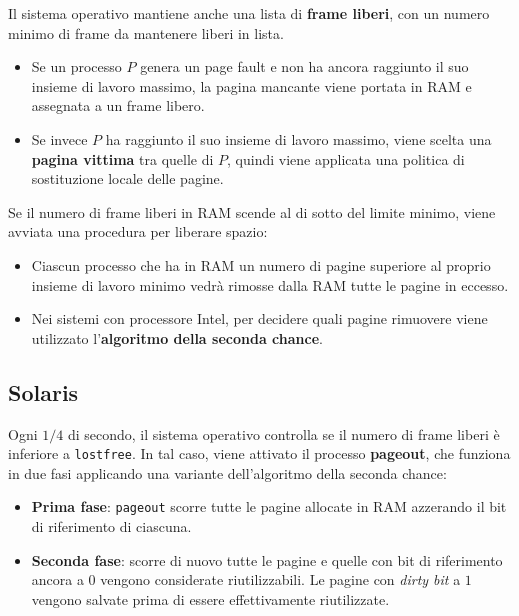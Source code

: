 Il sistema operativo mantiene anche una lista di \textbf{frame liberi}, con un numero minimo di frame da mantenere liberi in lista.

\begin{itemize}
    \item Se un processo $P$ genera un page fault e non ha ancora raggiunto il suo insieme di lavoro massimo, la pagina mancante viene portata in RAM e assegnata a un frame libero.
    \item Se invece $P$ ha raggiunto il suo insieme di lavoro massimo, viene scelta una \textbf{pagina vittima} tra quelle di $P$, quindi viene applicata una politica di sostituzione locale delle pagine.
\end{itemize}

Se il numero di frame liberi in RAM scende al di sotto del limite minimo, viene avviata una procedura per liberare spazio:
\begin{itemize}
    \item Ciascun processo che ha in RAM un numero di pagine superiore al proprio insieme di lavoro minimo vedrà rimosse dalla RAM tutte le pagine in eccesso.
    \item Nei sistemi con processore Intel, per decidere quali pagine rimuovere viene utilizzato l’\textbf{algoritmo della seconda chance}.
\end{itemize}

\subsection{Solaris}

Ogni $1/4$ di secondo, il sistema operativo controlla se il numero di frame liberi è inferiore a \texttt{lostfree}. In tal caso, viene attivato il processo \textbf{pageout}, che funziona in due fasi applicando una variante dell'algoritmo della seconda chance:

\begin{itemize}
    \item \textbf{Prima fase}: \texttt{pageout} scorre tutte le pagine allocate in RAM azzerando il bit di riferimento di ciascuna.
    \item \textbf{Seconda fase}: scorre di nuovo tutte le pagine e quelle con bit di riferimento ancora a $0$ vengono considerate riutilizzabili. Le pagine con \textit{dirty bit} a $1$ vengono salvate prima di essere effettivamente riutilizzate.
\end{itemize}

